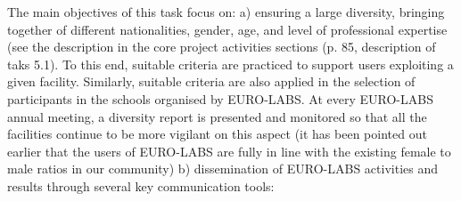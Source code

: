 The main objectives of this task focus on:
a) ensuring a large diversity, bringing together of different nationalities, gender, age, and level of professional expertise (see the description in the core project activities sections (p. 85, description of taks 5.1).
To this end, suitable criteria are practiced to support users exploiting a given facility. Similarly, suitable criteria are also applied in the selection of participants in the schools organised by EURO-LABS. At every EURO-LABS annual meeting, a diversity report is presented and monitored so that all the facilities continue to be more vigilant on this aspect (it has been pointed out earlier that the users of EURO-LABS are fully in line with the existing female to male ratios in our community)
b) dissemination of EURO-LABS activities and results through several key communication tools:

